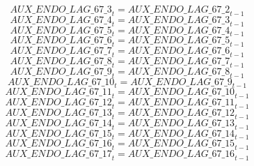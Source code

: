 \begin{dmath}
{AUX\_ENDO\_LAG\_67\_3}_{t}={AUX\_ENDO\_LAG\_67\_2}_{t-1}
\end{dmath}
\begin{dmath}
{AUX\_ENDO\_LAG\_67\_4}_{t}={AUX\_ENDO\_LAG\_67\_3}_{t-1}
\end{dmath}
\begin{dmath}
{AUX\_ENDO\_LAG\_67\_5}_{t}={AUX\_ENDO\_LAG\_67\_4}_{t-1}
\end{dmath}
\begin{dmath}
{AUX\_ENDO\_LAG\_67\_6}_{t}={AUX\_ENDO\_LAG\_67\_5}_{t-1}
\end{dmath}
\begin{dmath}
{AUX\_ENDO\_LAG\_67\_7}_{t}={AUX\_ENDO\_LAG\_67\_6}_{t-1}
\end{dmath}
\begin{dmath}
{AUX\_ENDO\_LAG\_67\_8}_{t}={AUX\_ENDO\_LAG\_67\_7}_{t-1}
\end{dmath}
\begin{dmath}
{AUX\_ENDO\_LAG\_67\_9}_{t}={AUX\_ENDO\_LAG\_67\_8}_{t-1}
\end{dmath}
\begin{dmath}
{AUX\_ENDO\_LAG\_67\_10}_{t}={AUX\_ENDO\_LAG\_67\_9}_{t-1}
\end{dmath}
\begin{dmath}
{AUX\_ENDO\_LAG\_67\_11}_{t}={AUX\_ENDO\_LAG\_67\_10}_{t-1}
\end{dmath}
\begin{dmath}
{AUX\_ENDO\_LAG\_67\_12}_{t}={AUX\_ENDO\_LAG\_67\_11}_{t-1}
\end{dmath}
\begin{dmath}
{AUX\_ENDO\_LAG\_67\_13}_{t}={AUX\_ENDO\_LAG\_67\_12}_{t-1}
\end{dmath}
\begin{dmath}
{AUX\_ENDO\_LAG\_67\_14}_{t}={AUX\_ENDO\_LAG\_67\_13}_{t-1}
\end{dmath}
\begin{dmath}
{AUX\_ENDO\_LAG\_67\_15}_{t}={AUX\_ENDO\_LAG\_67\_14}_{t-1}
\end{dmath}
\begin{dmath}
{AUX\_ENDO\_LAG\_67\_16}_{t}={AUX\_ENDO\_LAG\_67\_15}_{t-1}
\end{dmath}
\begin{dmath}
{AUX\_ENDO\_LAG\_67\_17}_{t}={AUX\_ENDO\_LAG\_67\_16}_{t-1}
\end{dmath}
